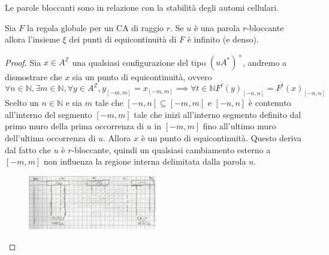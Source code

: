 Le parole bloccanti sono in relazione con la stabilità degli automi cellulari.
\begin{teorema}
    Sia $F$ la regola globale per un CA di raggio $r$. Se $u$ è una parola $r$-bloccante
    allora l'insieme $\xi$ dei punti di equicontinuità di $F$ è infinito (e denso).
    \begin{proof}
        Sia $x\in A^\mathbb{Z}$ una qualsiasi configurazione del tipo $(uA^\ast)^+$,
        andremo a dismostrare che $x$ sia un punto di equicontinuità, ovvero 
        $$\forall n\in \mathbb{N} ,\exists m\in \mathbb{N} , \forall y\in A^\mathbb{Z}, y_{[-m,m]} = x_{[-m,m]} \implies \forall t\in \mathbb{N} F^t(y)_{[-n,n]}=F^t(x)_{[-n,n]}$$
        Scelto un $n \in \mathbb{N}$ e sia $m$ tale che $[-n,n]\subseteq [-m,m]$
        e $[-n,n]$ è contenuto all'interno del segmento $[-m,m]$ tale che 
        inizi all'interno segmento definito dal primo muro della prima occorrenza di $u$ in $[-m,m]$ fino 
        all'ultimo muro dell'ultima occorrenza di $u$. Allora $x$ è un punto di 
        equicontinuità. Questo deriva dal fatto che $u$ è $r$-bloccante, quindi un
        qualsiasi cambiamento esterno a $[-m,m]$ non influenza la regione interna
        delimitata dalla parola $u$.
        \begin{figure}[!h]
            \centering
            \includegraphics[width=0.5\textwidth]{img/sistemi_complessi/blocking_word_2.png}
        \end{figure}
    \end{proof} 
\end{teorema}
